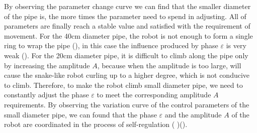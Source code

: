 By observing the parameter change curve we can find that the smaller diameter of the pipe is, the more times the parameter need to spend in adjusting. All of parameters are finally reach a stable value and satisfied with the requirement of movement. For the 40cm diameter pipe, the robot is not enough to form a single ring to wrap the pipe (), in this case the influence produced by phase $\varepsilon$ is very weak (). For the 20cm diameter pipe, it is difficult to climb along the pipe only by increasing the amplitude $A$, because when the amplitude is too large, will cause the snake-like robot curling up to a higher degree, which is not conducive to climb. Therefore, to make the robot climb small diameter pipe, we need to constantly adjust the phase $\varepsilon$ to meet the corresponding amplitude $A$ requirements. By observing the variation curve of the control parameters of the small diameter pipe, we can found that the phase $\varepsilon$ and the amplitude $A$ of the robot are coordinated in the process of self-regulation ( )().

